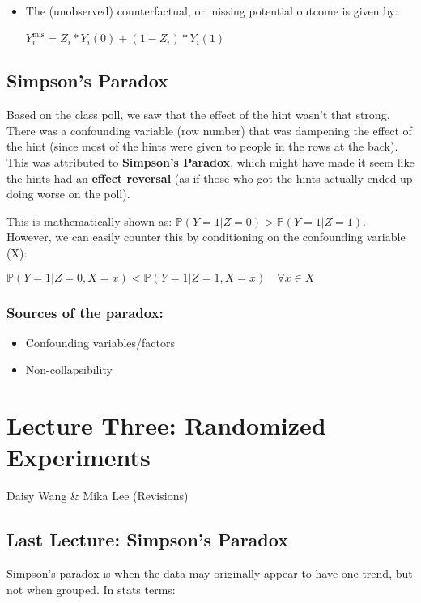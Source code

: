 \documentclass[11pt]{elegantbook}
\begin{document}
\begin{itemize}

\item The (unobserved) counterfactual, or missing potential outcome is given by:

$Y_i^{\text{mis}} = Z_i*Y_i(0) + (1-Z_i)*Y_i(1)$

\end{itemize}

\subsection{Simpson's Paradox}
Based on the class poll, we saw that the effect of the hint wasn't that strong. There was a confounding variable (row number) that was dampening the effect of the hint (since most of the hints were given to people in the rows at the back). This was attributed to \textbf{Simpson's Paradox}, which might have made it seem like the hints had an \textbf{effect reversal} (as if those who got the hints actually ended up doing worse on the poll).

This is mathematically shown as:
$\mathbb{P}(Y=1|Z=0) > \mathbb{P}(Y=1|Z=1)$. However, we can easily counter this by conditioning on the confounding variable (X):

\begin{center}
    $\mathbb{P}(Y=1|Z=0, X=x) < \mathbb{P}(Y=1|Z=1, X=x) \quad  \forall x \in X $
\end{center}

\subsubsection{Sources of the paradox:}
\begin{itemize}
    \item Confounding variables/factors
    \item Non-collapsibility
\end{itemize}

\section{Lecture Three: Randomized Experiments}{Daisy Wang \& Mika Lee (Revisions)}

\subsection{Last Lecture: Simpson's Paradox}
    Simpson's paradox is when the data may originally appear to have one trend, but not when grouped. In stats terms:
    
\end{document}
